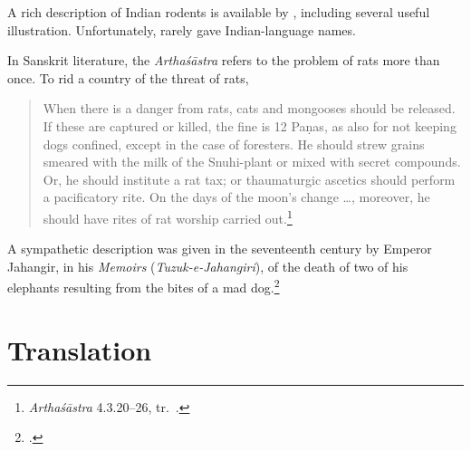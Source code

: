 A rich description of Indian rodents is available by \citet[ch.\,13,
esp.\,205--215]{bia}, including several useful illustration. 
Unfortunately, \citeauthor{bia} rarely gave Indian-language
names.

In Sanskrit literature, the \emph{Arthaśāstra} refers to the problem of rats 
more than once.  To rid a country of the threat of rats, 
\begin{quote}    
    When there is a danger from rats, cats and mongooses should be
released. If these are captured or killed, the fine is 12 Paṇas,
as also for not keeping dogs confined, except in the case of
foresters. He should strew grains smeared with the milk of the
Snuhi-plant or mixed with secret compounds. Or, he should
institute a rat tax; or thaumaturgic ascetics should perform a
pacificatory rite. On the days of the moon’s change \ldots,
moreover, he should have rites of rat worship carried
out.\footnote{\emph{Arthaśāstra} 4.3.20--26, tr.\ \cite[230]{oliv-2013}.}
\end{quote}

A sympathetic description was given in the seventeenth century by
Emperor Jahangir, in his \emph{Memoirs} (\emph{Tuzuk-e-Jahangiri}),
of the death of two of his elephants resulting from the bites of a
mad dog.\footcites[132--134]{alvi-1968}[145--146]{thac-1999}

\newpage

\section{Translation}

